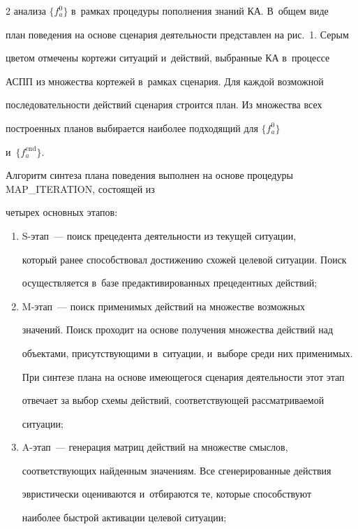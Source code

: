 \begin{multicols}{2}
анализа $\{f_a^0\}$ в~рамках процедуры пополнения знаний КА. В~общем виде 

план поведения на основе сценария де\-ятель\-ности пред\-став\-лен на рис.~1. Серым 

цветом отмечены кортежи ситуаций и~действий, выбранные КА в~процессе 

АСПП из множества кортежей в~рам\-ках сценария. Для каждой возможной 

по\-сле\-до\-ва\-тель\-ности действий сценария строится план. Из множества всех 

по\-стро\-ен\-ных планов выбирается наиболее подходящий для $\{ f_a^0\}$ 

и~$\{f_a^{\mathrm{end}}\}$.

  

  Алгоритм синтеза плана поведения выполнен на основе процедуры MAP\_ITERATION, со\-сто\-ящей из 

четырех основных этапов:

  \begin{enumerate}[(1)]

\item S-этап~--- поиск прецедента деятельности из текущей ситуации, 

который ранее способствовал достижению схожей целевой ситуации. Поиск 

осуществляется в~базе предактивированных прецедентных действий;

\item M-этап~--- поиск применимых действий на множестве воз\-мож\-ных 

значений. Поиск проходит на основе получения множества действий над 

объектами, присутствующими в~ситуации, и~выборе среди них применимых. 

При синтезе плана на основе име\-юще\-го\-ся сценария деятельности этот этап 

отвечает за выбор схемы действий, со\-от\-вет\-ст\-ву\-ющей рас\-смат\-ри\-ва\-емой 

ситуации;

\item A-этап~--- генерация мат\-риц действий на множестве смыс\-лов, 

со\-от\-вет\-ст\-ву\-ющих найденным значениям. Все сгенерированные действия 

эвристически оцениваются и~отбираются те, которые способствуют 

наиболее быст\-рой активации целевой ситуации;


\end{enumerate}
\end{multicols}
